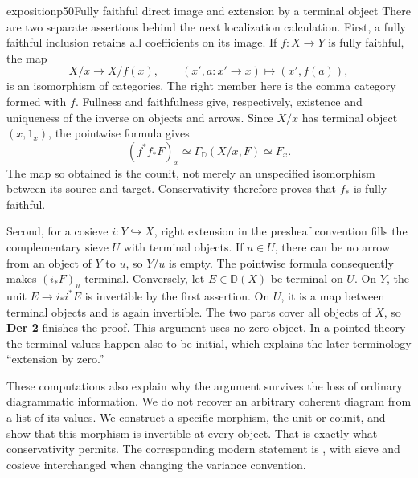 \begin{dcomment}{exposition}{p50}{Fully faithful direct image and extension by a terminal object}
There are two separate assertions behind the next localization calculation. First, a fully faithful inclusion retains all coefficients on its image. If $f:X\to Y$ is fully faithful, the map
\[
 X/x\longrightarrow X/f(x),\qquad
 (x',a:x'\to x)\longmapsto(x',f(a)),
\]
is an isomorphism of categories. The right member here is the comma category formed with $f$. Fullness and faithfulness give, respectively, existence and uniqueness of the inverse on objects and arrows. Since $X/x$ has terminal object $(x,1_x)$, the pointwise formula gives
\[
 (f^*f_*F)_x\simeq\Gamma_{\mathbb D}(X/x,F)\simeq F_x.
\]
The map so obtained is the counit, not merely an unspecified isomorphism between its source and target. Conservativity therefore proves that $f_*$ is fully faithful.

Second, for a cosieve $i:Y\hookrightarrow X$, right extension in the presheaf convention fills the complementary sieve $U$ with terminal objects. If $u\in U$, there can be no arrow from an object of $Y$ to $u$, so $Y/u$ is empty. The pointwise formula consequently makes $(i_*F)_u$ terminal. Conversely, let $E\in\mathbb D(X)$ be terminal on $U$. On $Y$, the unit $E\to i_*i^*E$ is invertible by the first assertion. On $U$, it is a map between terminal objects and is again invertible. The two parts cover all objects of $X$, so \textbf{Der 2} finishes the proof. This argument uses no zero object. In a pointed theory the terminal values happen also to be initial, which explains the later terminology ``extension by zero.''

These computations also explain why the argument survives the loss of ordinary diagrammatic information. We do not recover an arbitrary coherent diagram from a list of its values. We construct a specific morphism, the unit or counit, and show that this morphism is invertible at every object. That is exactly what conservativity permits. The corresponding modern statement is \citet[Proposition~1.23]{Groth2013}, with sieve and cosieve interchanged when changing the variance convention.
\end{dcomment}


